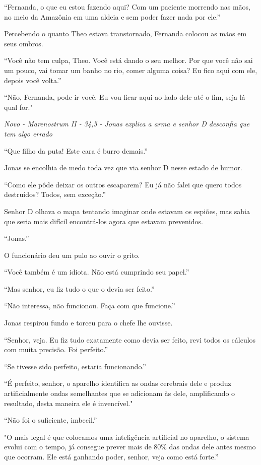 ``Fernanda, o que eu estou fazendo aqui? Com um paciente morrendo nas
mãos, no meio da Amazônia em uma aldeia e sem poder fazer nada por
ele.''

Percebendo o quanto Theo estava transtornado, Fernanda colocou as mãos
em seus ombros.

``Você não tem culpa, Theo. Você está dando o seu melhor. Por que você
não sai um pouco, vai tomar um banho no rio, comer alguma coisa? Eu fico
aqui com ele, depois você volta.''

``Não, Fernanda, pode ir você. Eu vou ficar aqui ao lado dele até o fim,
seja lá qual for."

\asterisc

\emph{Novo - Marenostrum II - 34,5 - Jonas explica a arma e senhor D
desconfia que tem algo errado}

``Que filho da puta! Este cara é burro demais.''

Jonas se encolhia de medo toda vez que via senhor D nesse estado de
humor.

``Como ele pôde deixar os outros escaparem? Eu já não falei que quero
todos destruídos? Todos, sem exceção.''

Senhor D olhava o mapa tentando imaginar onde estavam os espiões, mas
sabia que seria mais difícil encontrá-los agora que estavam prevenidos.

``Jonas.''

O funcionário deu um pulo ao ouvir o grito.

``Você também é um idiota. Não está cumprindo seu papel.''

``Mas senhor, eu fiz tudo o que o devia ser feito.''

``Não interessa, não funcionou. Faça com que funcione.''

Jonas respirou fundo e torceu para o chefe lhe ouvisse.

``Senhor, veja. Eu fiz tudo exatamente como devia ser feito, revi todos
os cálculos com muita precisão. Foi perfeito.''

``Se tivesse sido perfeito, estaria funcionando.''

``É perfeito, senhor, o aparelho identifica as ondas cerebrais dele e
produz artificialmente ondas semelhantes que se adicionam às dele,
amplificando o resultado, desta maneira ele é invencível."

``Não foi o suficiente, imbecil.''

"O mais legal é que colocamos uma inteligência artificial no aparelho, o
sistema evolui com o tempo, já consegue prever mais de 80\% das ondas
dele antes mesmo que ocorram. Ele está ganhando poder, senhor, veja como
está forte.''

